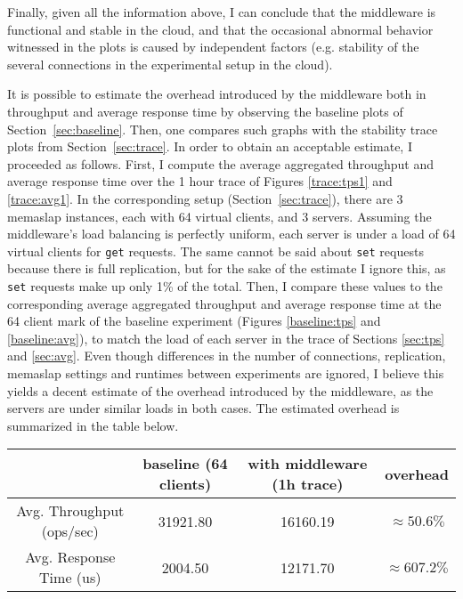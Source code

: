 \documentclass[11pt]{article}
\begin{document}
Finally, given all the information above, I can conclude that the middleware is functional and stable in the cloud, and that the occasional abnormal behavior witnessed in the plots is caused by independent factors (e.g. stability of the several connections in the experimental setup in the cloud).

It is possible to estimate the overhead introduced by the middleware both in throughput and average response time by observing the baseline plots of Section~\ref{sec:baseline}. Then, one compares such graphs with the stability trace plots from Section~\ref{sec:trace}. In order to obtain an acceptable estimate, I proceeded as follows. First, I compute the average aggregated throughput and average response time over the 1 hour trace of Figures \ref{trace:tps1} and \ref{trace:avg1}. In the corresponding setup (Section~\ref{sec:trace}), there are 3 memaslap instances, each with 64 virtual clients, and 3 servers. Assuming the middleware's load balancing is perfectly uniform, each server is under a load of 64 virtual clients for \texttt{get} requests. The same cannot be said about \texttt{set} requests because there is full replication, but for the sake of the estimate I ignore this, as \texttt{set} requests make up only 1\% of the total. Then, I compare these values to the corresponding average aggregated throughput and average response time at the 64 client mark of the baseline experiment (Figures \ref{baseline:tps} and \ref{baseline:avg}), to match the load of each server in the trace of Sections \ref{sec:tps} and \ref{sec:avg}. Even though differences in the number of connections, replication, memaslap settings and runtimes between experiments are ignored, I believe this yields a decent estimate of the overhead introduced by the middleware, as the servers are under similar loads in both cases. The estimated overhead is summarized in the table below.\\

\small{
	\smallskip
	\begin{tabular}{|c|c|c|c|}
		\hline & baseline (64 clients) & with middleware (1h trace) & overhead \\ 
		\hline Avg. Throughput (ops/sec) & 31921.80 & 16160.19 & $\approx 50.6\%$ \\ 
		\hline Avg. Response Time (us) & 2004.50 & 12171.70 & $\approx 607.2\%$\\ 
		\hline
	\end{tabular} }\\

\end{document}
